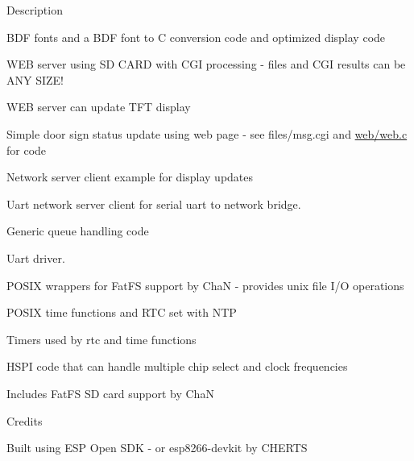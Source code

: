 \begin{DoxyParagraph}{Description}
\begin{DoxyItemize}
\begin{DoxyItemize}
\item B\-D\-F fonts and a B\-D\-F font to C conversion code and optimized display code
\item W\-E\-B server using S\-D C\-A\-R\-D with C\-G\-I processing -\/ files and C\-G\-I results can be A\-N\-Y S\-I\-Z\-E!
\item W\-E\-B server can update T\-F\-T display
\begin{DoxyItemize}
\item Simple door sign status update using web page -\/ see files/msg.\-cgi and \hyperlink{web_8c}{web/web.\-c} for code
\end{DoxyItemize}
\item Network server client example for display updates
\item Uart network server client for serial uart to network bridge.
\item Generic queue handling code
\item Uart driver.
\item P\-O\-S\-I\-X wrappers for Fat\-F\-S support by Cha\-N -\/ provides unix file I/\-O operations
\item P\-O\-S\-I\-X time functions and R\-T\-C set with N\-T\-P
\item Timers used by rtc and time functions
\item H\-S\-P\-I code that can handle multiple chip select and clock frequencies
\end{DoxyItemize}
\item Includes Fat\-F\-S S\-D card support by Cha\-N
\end{DoxyItemize}
\end{DoxyParagraph}
\begin{DoxyParagraph}{Credits}

\begin{DoxyItemize}
\item Built using E\-S\-P Open S\-D\-K -\/ or esp8266-\/devkit by C\-H\-E\-R\-T\-S 
\end{DoxyItemize}
\end{DoxyParagraph}
